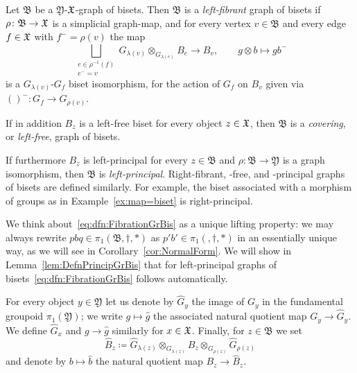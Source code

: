 \documentclass{amsart}
\begin{document}
\begin{defn}\label{dfn:FibrationGrBis}
  Let $\mathfrak B$ be a $\mathfrak Y$-${\mathfrak X}$-graph of bisets. Then
  $\mathfrak B$ is a \emph{left-fibrant} graph of bisets if $\rho\colon \mathfrak
  B\to{\mathfrak X}$ is a simplicial graph-map, and for every vertex $v\in \mathfrak
  B$ and every edge $f\in {\mathfrak X}$ with $f^-=\rho(v)$ the map
  \begin{equation}\label{eq:dfn:FibrationGrBis}
    \bigsqcup_{\substack{e\in \rho^{-1}(f)\\ e^-=v}} G_{\lambda(v)}
    \otimes_{G_{\lambda(e)}} B_e\rightarrow B_v,\qquad g\otimes b\mapsto g b^-
  \end{equation}
  is a $G_{\lambda(v)}$-$G_f$ biset isomorphism, for the action of $G_f$ on
  $B_v$ given via $()^-\colon G_f\to G_{\rho(v)}$.

  If in addition $B_z$ is a left-free biset for every object $z\in {\mathfrak X}$,
  then $\mathfrak B$ is a \emph{covering}, or \emph{left-free}, graph
  of bisets.
  
  If furthermore $B_z$ is left-principal for every $z\in \mathfrak B$
  and $\rho \colon \mathfrak B\to \mathfrak Y$ is a graph isomorphism,
  then $\mathfrak B$ is \emph{left-principal}.  Right-fibrant, -free,
  and -principal graphs of bisets are defined similarly. For example,
  the biset associated with a morphism of groups as in
  Example~\ref{ex:map=biset} is right-principal.
\end{defn}  
We think about~\eqref{eq:dfn:FibrationGrBis} as a unique lifting
property: we may always rewrite
$p b q\in \pi_1(\mathfrak B,\dagger,*)$ as
$p' b'\in\pi_1(\mathfrak,\dagger,*)$ in an essentially unique way, as
we will see in Corollary~\ref{cor:NormalForm}. We will show in
Lemma~\ref{lem:DefnPrincipGrBis} that for left-principal graphs of
bisets~\eqref{eq:dfn:FibrationGrBis} follows automatically.
  
For every object $y\in \mathfrak Y$ let us denote by $\widehat G_y$
the image of $G_y$ in the fundamental groupoid $\pi_1(\mathfrak Y)$;
we write $g\mapsto \widehat g$ the associated natural quotient map
$G_y\to\widehat G_y$. We define $\widehat G_x$ and $g\to\widehat g$
similarly for $x\in\mathfrak {{\mathfrak X}}$.  Finally, for $z\in \mathfrak B$ we
set
\[\widehat B_z\coloneqq \widehat G_{\lambda(z)}\otimes_{G_{\lambda(z)}} B_z \otimes_{G_{\rho(z)}}  \widehat G_{\rho(z)}\]
and denote by $b\mapsto\widehat b$ the natural quotient map $B_z\to
\widehat B_z$.
\end{document}
